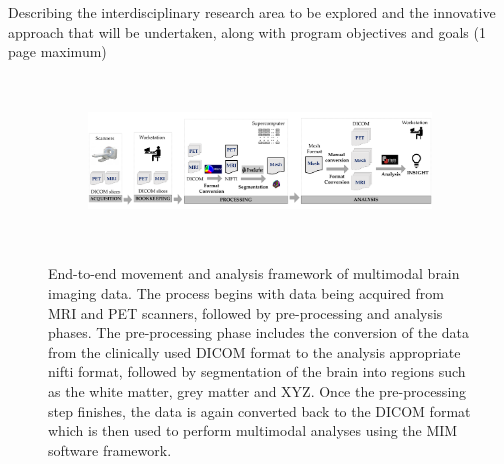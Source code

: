 \documentclass[11pt]{article}
\begin{document}





Describing the interdisciplinary research area to be explored and the innovative approach that will be undertaken, along with program objectives and goals (1 page maximum)\\


\begin{figure}
	\centering
	\begin{subfigure}{1\textwidth}
		\centering
		\includegraphics[width=\textwidth, height=4.5cm]{Existing.pdf}
	\end{subfigure}
	\caption {End-to-end movement and analysis framework of multimodal brain imaging data. The process begins with data being acquired from MRI and PET scanners, followed by pre-processing and analysis phases. The pre-processing phase includes the conversion of the data from the clinically used DICOM format to the analysis appropriate nifti format, followed by segmentation of the brain into regions such as the white matter, grey matter and XYZ. Once the pre-processing step finishes, the data is again converted back to the DICOM format which is then used to perform multimodal analyses using the MIM software framework.}
	\label{fig:theta_sens}
\end{figure}
\end{document}
